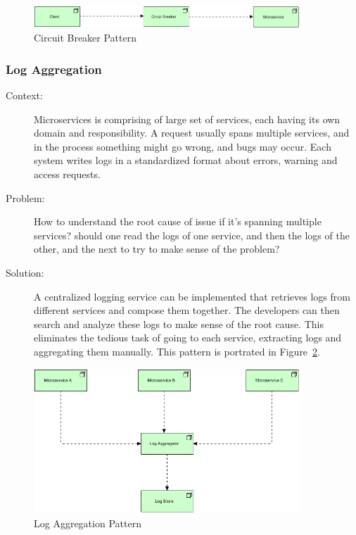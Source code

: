 \documentclass{bmcart}
\begin{document}
\begin{figure}[h]
  \includegraphics[width=10cm]{Media/Circuit Breaker.jpg}
  \caption{Circuit Breaker Pattern}
  \label{circuitBreaker}
\end{figure}

\subsubsection{Log Aggregation}

\begin{description}
  \item[Context:] Microservices is comprising of large set of services, each having its own domain and responsibility. A request usually spans multiple services, and in the process something might go wrong, and bugs may occur. Each system writes logs in a standardized format about errors, warning and access requests. 
  \item[Problem:] How to understand the root cause of issue if it's spanning multiple services? should one read the logs of one service, and then the logs of the other, and the next to try to make sense of the problem?  
  \item[Solution:] A centralized logging service can be implemented that retrieves logs from different services and compose them together. The developers can then search and analyze these logs to make sense of the root cause. This eliminates the tedious task of going to each service, extracting logs and aggregating them manually. This pattern is portrated in Figure~\ref{logAggregation}.    
\end{description}



\begin{figure}[h]
  \includegraphics[width=10cm]{Media/Log Aggregation Pattern.jpg}
  \caption{Log Aggregation Pattern}
  \label{logAggregation}
\end{figure}
\end{document}
